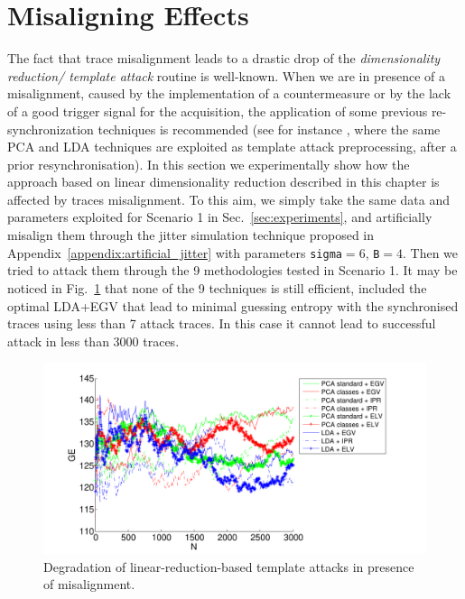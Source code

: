 \section{Misaligning Effects}\label{sec:misalignment}
The fact that trace misalignment leads to a drastic drop of the \emph{dimensionality reduction/ template attack} routine is well-known. When we are in presence of a misalignment, caused by the implementation of a countermeasure or  by the lack of a good trigger signal for the acquisition, the application of some previous re-synchronization techniques is recommended (see for instance \cite{choudary2014template}, where the same PCA and LDA techniques are exploited as template attack preprocessing, after a prior resynchronisation). In this section we experimentally show how the approach based on linear dimensionality reduction described in this chapter is affected by traces misalignment. To this aim, we simply take the same data and parameters exploited for Scenario 1 in Sec.~\ref{sec:experiments}, and artificially misalign them through the jitter simulation technique proposed in Appendix~\ref{appendix:artificial_jitter} with parameters \texttt{sigma}$= 6$, \texttt{B}$= 4$. Then we tried to attack them through the 9 methodologies tested in Scenario 1. It may be noticed in Fig.~\ref{fig:PCA_LDA_misalignment} that none of the 9 techniques is still efficient, included the optimal LDA+EGV that lead to minimal guessing entropy with the synchronised traces using less than 7 attack traces. In this case it cannot lead to successful attack in less than 3000 traces.
\begin{figure}
\includegraphics[width=\textwidth]{../Figures/desynchro_results_PCA_LDA.pdf} 
\caption{Degradation of linear-reduction-based template attacks in presence of misalignment.}\label{fig:PCA_LDA_misalignment}
\end{figure}